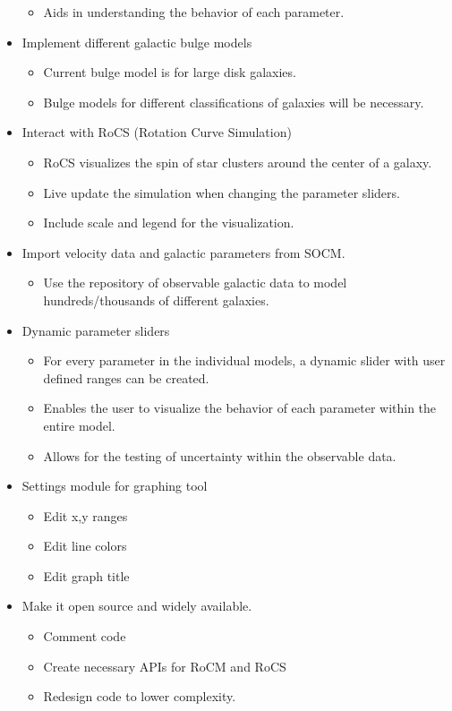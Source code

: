 \documentclass[12pt]{article}
\begin{document}
\begin{itemize}
\begin{itemize}
		\item Aids in understanding the behavior of each parameter.
	\end{itemize}
	\item Implement different galactic bulge models
	\begin{itemize}
		\item Current bulge model is for large disk galaxies.
		\item Bulge models for different classifications of galaxies will be necessary.
	\end{itemize}
	\item Interact with RoCS (Rotation Curve Simulation)
	\begin{itemize}
		\item RoCS visualizes the spin of star clusters around the center of a galaxy. 
		\item Live update the simulation when changing the parameter sliders.
		\item Include scale and legend for the visualization.
	\end{itemize}
	\item Import velocity data and galactic parameters from SOCM.
	\begin{itemize}
		\item Use the repository of observable galactic data to model hundreds/thousands of different galaxies.
	\end{itemize}
	\item Dynamic parameter sliders
	\begin{itemize}
		\item For every parameter in the individual models, a dynamic slider with user defined ranges can be created. 
		\item Enables the user to visualize the behavior of each parameter within the entire model.
		\item Allows for the testing of uncertainty within the observable data.
	\end{itemize}
	\item Settings module for graphing tool
	\begin{itemize}
		\item Edit x,y ranges
		\item Edit line colors
		\item Edit graph title
	\end{itemize}
	\item Make it open source and widely available.
	\begin{itemize}
		\item Comment code
		\item Create necessary APIs for RoCM and RoCS
		\item Redesign code to lower complexity.	
	\end{itemize}
\end{itemize}
\end{document}
